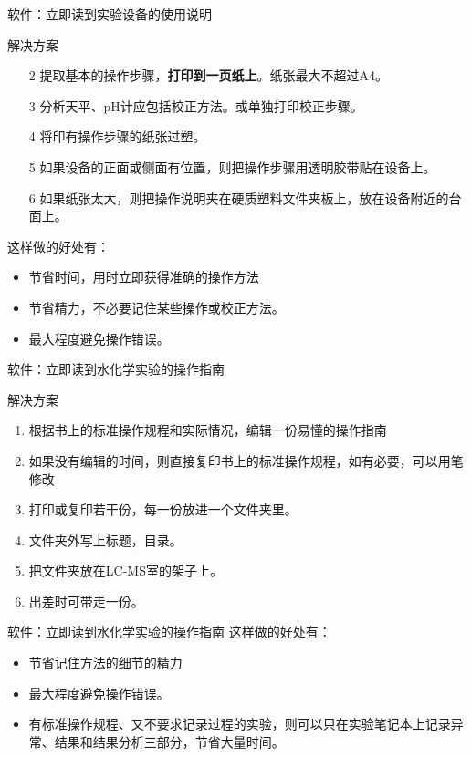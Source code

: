 \documentclass[CJKutf8]{beamer}
\newenvironment{SC}{%
  \CJKfamily{gbsn}%
  \CJKtilde
  \CJKnospace}{}
\begin{document}
\begin{CJK}{UTF8}{}
\begin{SC}
\begin{frame}{软件：立即读到实验设备的使用说明}
 \begin{block}{解决方案}
    \begin{enumerate}
    \item[2] 提取基本的操作步骤，\textbf{打印到一页纸上}。纸张最大不超过A4。
    \item[3] 分析天平、pH计应包括校正方法。或单独打印校正步骤。
    \item[4] 将印有操作步骤的纸张过塑。
    \item[5] 如果设备的正面或侧面有位置，则把操作步骤用透明胶带贴在设备上。
    \item[6] 如果纸张太大，则把操作说明夹在硬质塑料文件夹板上，放在设备附近的台面上。
    \end{enumerate}
  \end{block}
  \pause
  这样做的好处有：
  \begin{itemize}
  \item 节省时间，用时立即获得准确的操作方法
  \pause
  \item 节省精力，不必要记住某些操作或校正方法。
  \pause
  \item 最大程度避免操作错误。
  \end{itemize}
\end{frame}

\begin{frame}{软件：立即读到水化学实验的操作指南}
  \begin{block}{解决方案}
    \begin{enumerate}
    \item 根据书上的标准操作规程和实际情况，编辑一份易懂的操作指南
    \item 如果没有编辑的时间，则直接复印书上的标准操作规程，如有必要，可以用笔修改
    \item 打印或复印若干份，每一份放进一个文件夹里。
    \item 文件夹外写上标题，目录。
    \item 把文件夹放在LC-MS室的架子上。
    \item 出差时可带走一份。
    \end{enumerate}
  \end{block}
\end{frame}

\begin{frame}{软件：立即读到水化学实验的操作指南}
  这样做的好处有：
  \begin{itemize}
  \item 节省记住方法的细节的精力
  \pause
  \item 最大程度避免操作错误。
  \pause
  \item 有标准操作规程、又不要求记录过程的实验，则可以只在实验笔记本上记录异常、结果和结果分析三部分，节省大量时间。
  \end{itemize}
\end{frame}


\end{SC}
\end{CJK}
\end{document}
